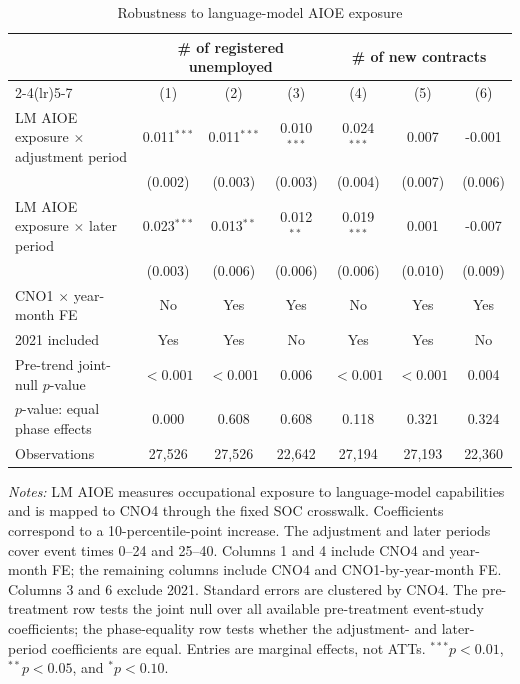 \begin{table}[!htbp]
\centering
\caption{Robustness to language-model AIOE exposure}
\label{tab:v1_lm_aioe_exposure}
\begin{threeparttable}
\scriptsize
\setlength{\tabcolsep}{3.5pt}
\begin{tabular}{lcccccc}
\toprule
& \multicolumn{3}{c}{\# of registered unemployed} & \multicolumn{3}{c}{\# of new contracts} \\
\cmidrule(lr){2-4}\cmidrule(lr){5-7}
& (1) & (2) & (3) & (4) & (5) & (6) \\
\midrule
LM AIOE exposure $\times$ adjustment period & 0.011$^{***}$ & 0.011$^{***}$ & 0.010$^{***}$ & 0.024$^{***}$ & 0.007 & -0.001 \\
 & (0.002) & (0.003) & (0.003) & (0.004) & (0.007) & (0.006) \\
LM AIOE exposure $\times$ later period & 0.023$^{***}$ & 0.013$^{**}$ & 0.012$^{**}$ & 0.019$^{***}$ & 0.001 & -0.007 \\
 & (0.003) & (0.006) & (0.006) & (0.006) & (0.010) & (0.009) \\
\midrule
CNO1 $\times$ year-month FE & No & Yes & Yes & No & Yes & Yes \\
2021 included & Yes & Yes & No & Yes & Yes & No \\
Pre-trend joint-null $p$-value & $<0.001$ & $<0.001$ & 0.006 & $<0.001$ & $<0.001$ & 0.004 \\
$p$-value: equal phase effects & 0.000 & 0.608 & 0.608 & 0.118 & 0.321 & 0.324 \\
Observations & 27,526 & 27,526 & 22,642 & 27,194 & 27,193 & 22,360 \\
\bottomrule
\end{tabular}
\begin{tablenotes}[flushleft]
\footnotesize
\item \emph{Notes:} LM AIOE measures occupational exposure to language-model capabilities and is mapped to CNO4 through the fixed SOC crosswalk. Coefficients correspond to a 10-percentile-point increase. The adjustment and later periods cover event times 0--24 and 25--40. Columns 1 and 4 include CNO4 and year-month FE; the remaining columns include CNO4 and CNO1-by-year-month FE. Columns 3 and 6 exclude 2021. Standard errors are clustered by CNO4. The pre-treatment row tests the joint null over all available pre-treatment event-study coefficients; the phase-equality row tests whether the adjustment- and later-period coefficients are equal. Entries are marginal effects, not ATTs. $^{***}p<0.01$, $^{**}p<0.05$, and $^{*}p<0.10$.
\end{tablenotes}
\end{threeparttable}
\end{table}

